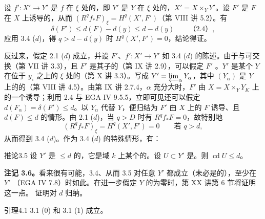 设 $f':X'\to Y'$ 是 $f$ 在 $\xi$ 处的，即 $Y'$ 是 $Y$ 在 $\xi$ 处的，$X'=X\times_YY'$。设 $F'$ 是 $F$ 在 $X$ 上诱导的，从而 $(R^qf_*F)_\xi=H^q(X',F')$（第 VIII 讲 5.2）。有
\[
\delta(F')\leq d(F)-d(y)\leq d-d(y)\qquad\text{（2.4）},
\]
应用 3.4 ($d$)，得 $q>d-d(y)$ 时 $H^q(X',F')=0$，结论得证。

反过来，假定 2.1 ($d$) 成立，并设 $F'$、$f':X'\to Y'$ 如 3.4 ($d$) 的陈述。由于与可交换（第 VII 讲 3.3），且 $F'$ 是其子的（第 IX 讲 2.9），可以假定 $F'$ 。$Y'$ 是某个 $Y$ 在位于 $y_\circ$ 之上的 $\xi$ 处的（第 X 讲 3.3）。写成 $Y'=\varprojlim_\alpha Y_\alpha$，其中 $(Y_\alpha)$ 是 $Y$ 上的的（第 VIII 讲 4.5）。由第 IX 讲 2.7.4，$\alpha$ 充分大时，$F'$ 由 $X=X\times_YY_K$ 上的一个诱导；利用 2.4 与 EGA IV 9.5.5，立即可见还可以假定 $d(F_\alpha)=\delta(F')\leq d$。以 $Y_\alpha$ 代替 $Y$，便归结为 $F'$ 由 $X$ 上的 $F$ 诱导、且 $d(F)\leq d$ 的情形。由 2.1 ($d$)，当 $q>D$ 时有 $R^qf_*F=0$，故特别地
\[
(R^qf_*F)_\xi=H^q(X',F')=0\qquad\text{若 }q>d,
\]
从而得到 3.4 ($d$)。作为 3.4 ($d$) 的特殊情形，有：
\begin{SGAresult}{推论}{3.5}
设 $Y'$ 是 $\leq d$ 的，它是域 $k$ 上某个的。设 $U\subset Y'$ 是。则 $\operatorname{cd}U\leq d$。
\end{SGAresult}
\textbf{注记 3.6。}看来很有可能，3.4、从而 3.5 对任意 $Y'$ 都成立（未必是的），至少在 $Y'$ （EGA IV 7.8）时如此。在进一步假定 $Y$ 的为零时，第 XX 讲第 6 节将证明这一点。
证明对 $d$ 归纳。
\begin{SGAresult}{引理}{4.1}
3.1 (0) 和 3.1 (1) 成立。
\end{SGAresult}
